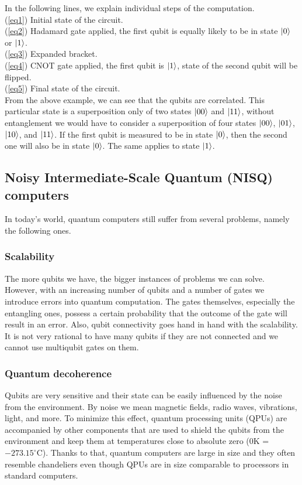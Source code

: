 \noindent In the following lines, we explain individual steps of the computation.\\
\noindent (\ref{eq1}) Initial state of the circuit.\\
(\ref{eq2}) Hadamard gate applied, the first qubit is equally likely to be in state $\lvert0\rangle$ or $\lvert1\rangle$.\\
(\ref{eq3}) Expanded bracket.\\
(\ref{eq4}) CNOT gate applied, the first qubit is $\lvert1\rangle$, state of the second qubit will be flipped.\\
(\ref{eq5}) Final state of the circuit.\\

\noindent From the above example, we can see that the qubits are correlated. This particular state is a superposition only of two states $\lvert00\rangle$ and $\lvert11\rangle$, without entanglement we would have to consider a superposition of four states $\lvert00\rangle$, $\lvert01\rangle$, $\lvert10\rangle$, and $\lvert11\rangle$. If the first qubit is measured to be in state $\lvert0\rangle$, then the second one will also be in state $\lvert0\rangle$. The same applies to state $\lvert1\rangle$.

\subsection*{Noisy Intermediate-Scale Quantum (NISQ) computers}
In today's world, quantum computers still suffer from several problems, namely the following ones.

\subsubsection{Scalability}
The more qubits we have, the bigger instances of problems we can solve. However, with an increasing number of qubits and a number of gates we introduce errors into quantum computation. The gates themselves, especially the entangling ones, possess a certain probability that the outcome of the gate will result in an error. Also, qubit connectivity goes hand in hand with the scalability. It is not very rational to have many qubits if they are not connected and we cannot use multiqubit gates on them.

\subsubsection{Quantum decoherence}
Qubits are very sensitive and their state can be easily influenced by the noise from the environment. By noise we mean magnetic fields, radio waves, vibrations, light, and more. To minimize this effect, quantum processing units (QPUs) are accompanied by other components that are used to shield the qubits from the environment and keep them at temperatures close to absolute zero ($0$K = $-273.15^{\circ}$C). Thanks to that, quantum computers are large in size and they often resemble chandeliers even though QPUs are in size comparable to processors in standard computers.

